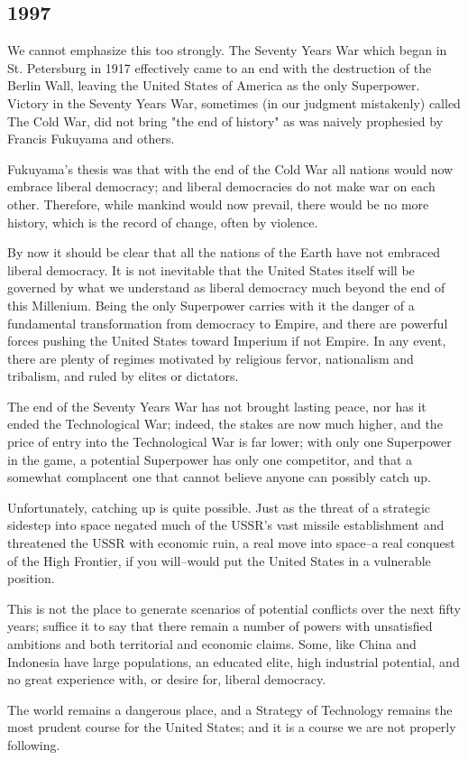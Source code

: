 \subsection{1997}
We cannot emphasize this too strongly. The Seventy Years War which began in St. Petersburg in 1917 effectively came to an end with the destruction of the Berlin Wall, leaving the United States of America as the only Superpower. Victory in the Seventy Years War, sometimes (in our judgment mistakenly) called The Cold War, did not bring "the end of history" as was naively prophesied by Francis Fukuyama and others.

Fukuyama's thesis was that with the end of the Cold War all nations would now embrace liberal democracy; and liberal democracies do not make war on each other. Therefore, while mankind would now prevail, there would be no more history, which is the record of change, often by violence.

By now it should be clear that all the nations of the Earth have not embraced liberal democracy. It is not inevitable that the United States itself will be governed by what we understand as liberal democracy much beyond the end of this Millenium. Being the only Superpower carries with it the danger of a fundamental transformation from democracy to Empire, and there are powerful forces pushing the United States toward Imperium if not Empire. In any event, there are plenty of regimes motivated by religious fervor, nationalism and tribalism, and ruled by elites or dictators.

The end of the Seventy Years War has not brought lasting peace, nor has it ended the Technological War; indeed, the stakes are now much higher, and the price of entry into the Technological War is far lower; with only one Superpower in the game, a potential Superpower has only one competitor, and that a somewhat complacent one that cannot believe anyone can possibly catch up.

Unfortunately, catching up is quite possible. Just as the threat of a strategic sidestep into space negated much of the USSR's vast missile establishment and threatened the USSR with economic ruin, a real move into space--a real conquest of the High Frontier, if you will--would put the United States in a vulnerable position.

This is not the place to generate scenarios of potential conflicts over the next fifty years; suffice it to say that there remain a number of powers with unsatisfied ambitions and both territorial and economic claims. Some, like China and Indonesia have large populations, an educated elite, high industrial potential, and no great experience with, or desire for, liberal democracy.

The world remains a dangerous place, and a Strategy of Technology remains the most prudent course for the United States; and it is a course we are not properly following.
